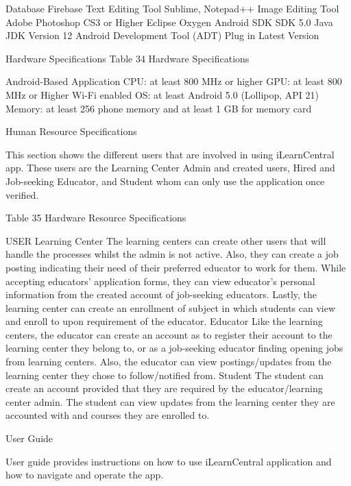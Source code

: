 Database	Firebase
Text Editing Tool	Sublime, Notepad++
Image Editing Tool	Adobe Photoshop CS3 or Higher
Eclipse	Oxygen
Android SDK	SDK 5.0
Java JDK	Version 12
Android Development Tool (ADT) Plug in	Latest Version


Hardware Specifications	
Table 34
Hardware Specifications

Android-Based Application	CPU: at least 800 MHz or higher
GPU: at least 800 MHz or Higher
Wi-Fi enabled
OS: at least Android 5.0 (Lollipop, API 21)
Memory: at least 256 phone memory and at least 1 GB for memory card



Human Resource Specifications

	This section shows the different users that are involved in using iLearnCentral app. These users are the Learning Center Admin and created users, Hired and Job-seeking Educator, and Student whom can only use the application once verified. 




Table 35
Hardware Resource Specifications

USER	
Learning Center	The learning centers can create other users that will handle the processes whilst the admin is not active. Also, they can create a job posting indicating their need of their preferred educator to work for them. While accepting educators’ application forms, they can view educator’s personal information from the created account of job-seeking educators. Lastly, the learning center can create an enrollment of subject in which students can view and enroll to upon requirement of the educator. 
Educator	Like the learning centers, the educator can create an account as to register their account to the learning center they belong to, or as a job-seeking educator finding opening jobs from learning centers. Also, the educator can view postings/updates from the learning center they chose to follow/notified from. 
Student	The student can create an account provided that they are required by the educator/learning center admin. The student can view updates from the learning center they are accounted with and courses they are enrolled to.











User Guide

	User guide provides instructions on how to use iLearnCentral application and how to navigate and operate the app. 

